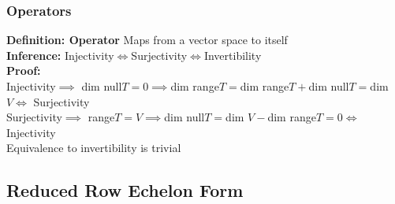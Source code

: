 \documentclass{article}
\newcommand{\0}{{\bf{0}}}
\begin{document}
\subsubsection{Operators}
\textbf{Definition: Operator} Maps from a vector space to itself\\
\textbf{Inference:} Injectivity$\iff$Surjectivity$\iff$Invertibility\\
\textbf{Proof:}\\
Injectivity$\implies$ dim null$T=0\implies$dim range$T=$dim range$T+$dim null$T=$dim $V\iff$ Surjectivity\\
Surjectivity$\implies$ range$T=V\implies$dim null$T=$dim $V-$dim range$T=0\iff$ Injectivity\\
Equivalence to invertibility is trivial
\subsection{Reduced Row Echelon Form}
\end{document}
